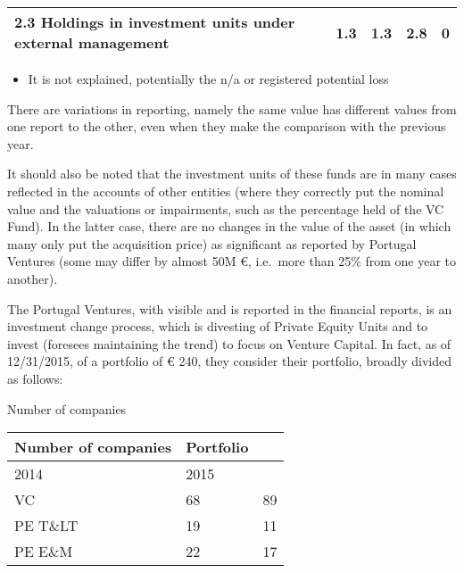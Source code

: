 \documentclass[]{book}
\newcommand{\euro}{€}
\providecommand{\tightlist}{%
  \setlength{\itemsep}{0pt}\setlength{\parskip}{0pt}}
\theoremstyle{definition}
\theoremstyle{definition}
\theoremstyle{definition}
\theoremstyle{remark}
\begin{document}
\begin{longtable}[]{@{}lllll@{}}
\begin{minipage}[t]{0.17\columnwidth}\raggedright\strut
2.3 Holdings in investment units under external management\strut
\end{minipage} & \begin{minipage}[t]{0.17\columnwidth}\raggedright\strut
1.3\strut
\end{minipage} & \begin{minipage}[t]{0.17\columnwidth}\raggedright\strut
1.3\strut
\end{minipage} & \begin{minipage}[t]{0.17\columnwidth}\raggedright\strut
2.8\strut
\end{minipage} & \begin{minipage}[t]{0.17\columnwidth}\raggedright\strut
0\strut
\end{minipage}\tabularnewline
\bottomrule
\end{longtable}

\begin{itemize}
\tightlist
\item
  It is not explained, potentially the n/a or registered potential loss
\end{itemize}

There are variations in reporting, namely the same value has different
values from one report to the other, even when they make the comparison
with the previous year.

It should also be noted that the investment units of these funds are in
many cases reflected in the accounts of other entities (where they
correctly put the nominal value and the valuations or impairments, such
as the percentage held of the VC Fund). In the latter case, there are no
changes in the value of the asset (in which many only put the
acquisition price) as significant as reported by Portugal Ventures (some
may differ by almost 50M \euro{}, i.e.~more than 25\% from one year to
another).

The Portugal Ventures, with visible and is reported in the financial
reports, is an investment change process, which is divesting of Private
Equity Units and to invest (foresees maintaining the trend) to focus on
Venture Capital. In fact, as of 12/31/2015, of a portfolio of \euro{}
240, they consider their portfolio, broadly divided as follows:

Number of companies

\begin{longtable}[]{@{}lll@{}}
\toprule
Number of companies & Portfolio &\tabularnewline
\midrule
\endhead
2014 & 2015\tabularnewline
VC & 68 & 89\tabularnewline
PE T\&LT & 19 & 11\tabularnewline
PE E\&M & 22 & 17\tabularnewline
\bottomrule
\end{longtable}
\end{document}
